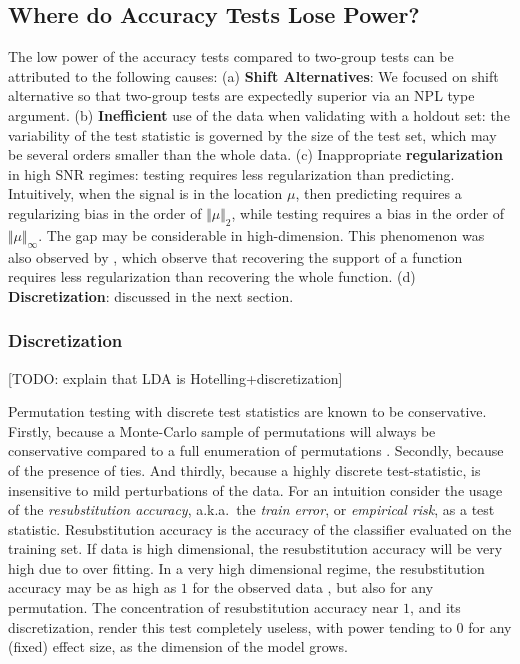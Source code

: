 \documentclass[journal]{IEEEtran}
\begin{document}
\subsection{Where do Accuracy Tests Lose Power?}
The low power of the accuracy tests compared to two-group tests can be attributed to the following causes: \newline
(a) \textbf{Shift Alternatives}: 
We focused on shift alternative so that two-group tests are expectedly superior via an NPL type argument.\newline
(b) \textbf{Inefficient} use of the data when validating with a holdout set:
the variability of the test statistic is governed by the size of the test set, which may be several orders smaller than the whole data.
\newline
(c) Inappropriate \textbf{regularization} in high SNR regimes: testing requires less regularization than predicting. 
Intuitively, when the signal is in the location $\mu$, then predicting requires a regularizing bias in the order of $\Vert \mu \Vert_2$, while testing requires a bias in the order of $\Vert \mu \Vert_\infty$.
The gap may be considerable in high-dimension.
This phenomenon was also observed by \cite{cheng2017multiple}, which observe that recovering the support of a function requires less regularization than recovering the whole function.
\newline
(d) \textbf{Discretization}: discussed in the next section.


\subsubsection{Discretization}
[TODO: explain that LDA is Hotelling+discretization]

Permutation testing with discrete test statistics are known to be conservative.
Firstly, because a Monte-Carlo sample of permutations will always be conservative compared to a full enumeration of permutations \cite{hemerik_exact_2014}.
Secondly, because of the presence of ties.
And thirdly, because a highly discrete test-statistic, is insensitive to mild perturbations of the data. 
For an intuition consider the usage of the \emph{resubstitution accuracy}, a.k.a.\ the \emph{train error}, or \emph{empirical risk}, as a test statistic. 
Resubstitution accuracy is the accuracy of the classifier evaluated on the training set.
If data is high dimensional, the resubstitution accuracy will be very high due to over fitting. 
In a very high dimensional regime, the resubstitution accuracy may be as high as $1$ for the observed data \cite[Theorem 1]{mclachlan_bias_1976}, but also for any permutation.
The concentration of resubstitution accuracy near $1$, and its discretization, render this test completely useless, with power tending to $0$ for any (fixed) effect size, as the dimension of the model grows. 
\end{document}
